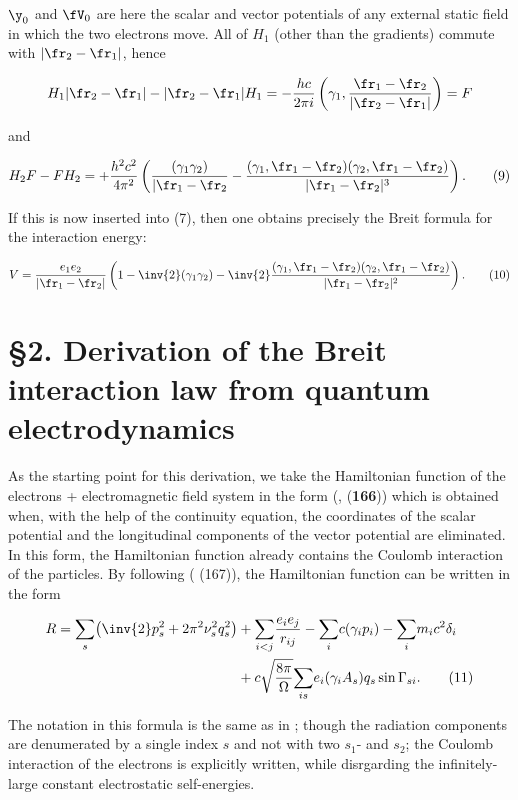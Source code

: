 \documentclass{article}
\newcommand{\nequ}[2]{
\begin{align*}
#1
\tag{#2}
\end{align*}
}
\newcommand{\uequ}[1]{
\begin{align*}
#1
\end{align*}
}
\newcommand{\sumX}[1]{\underset{#1}{\sum}}
\begin{document}
$\y_0$ and $\fV_0$ are here the scalar and vector potentials of any external static field in which the two electrons move. All  of $H_1$ (other than the gradients) commute with $|\fr_2-\fr_1|$, hence
\uequ{
H_1|\fr_2-\fr_1| - |\fr_2-\fr_1|H_1 
= -\frac{hc}{2\pi i}\left(\gamma_1, \frac{\fr_1-\fr_2}{|\fr_2-\fr_1|}\right) = F
}
and
\nequ{
H_2 F - F H_2 = +\frac{h^2 c^2}{4\pi^2}\left(\frac{(\gamma_1 \gamma_2)}{|\fr_1-\fr_2}
 - \frac{(\gamma_1, \fr_1-\fr_2)(\gamma_2,\fr_1-\fr_2)}{|\fr_1-\fr_2|^3}\right).
}{9}
If this is now inserted into (7), then one obtains precisely the Breit formula for the interaction energy:
\nequ{
V=\frac{e_1 e_2}{|\fr_1-\fr_2|}\left(1-\inv{2}(\gamma_1 \gamma_2) 
- \inv{2}\frac{(\gamma_1, \fr_1 - \fr_2)(\gamma_2, \fr_1 - \fr_2)}{|\fr_1-\fr_2|^2}\right).
}{10}

\section*{§2. Derivation of the Breit interaction law from quantum electrodynamics}

As the starting point for this derivation, we take the Hamiltonian function of the electrons + electromagnetic field system in the form (\cite{5}, (\textbf{166})) which is obtained when, with the help of the continuity equation, the coordinates of the scalar potential and the longitudinal components of the vector potential are eliminated. In this form, the Hamiltonian function already contains the Coulomb interaction of the particles. By following (\cite{5} (167)), the Hamiltonian function can be written in the form
\nequ{
R = \sumX{s}{\left(\inv{2}p_s^2 + 2\pi^2 \nu_s^2 q_s^2 \right)}
 &+ \sumX{i<j}{\frac{e_i e_j}{r_{ij}}} - \sumX{i}{c(\gamma_i p_i)} - \sumX{i}{m_i c^2 \delta_i}\\
 &+ c\sqrt{\frac{8\pi}{\Omega}}\sumX{is}{e_i(\gamma_i A_s)q_s\sin{\Gamma_{si}}}.
}{11}
The notation in this formula is the same as in \cite{5}; though the radiation components are denumerated by a single index $s$ and not with two $s_1$- and $s_2$; the Coulomb interaction of the electrons is explicitly written, while disrgarding the infinitely-large constant electrostatic self-energies.
\end{document}
